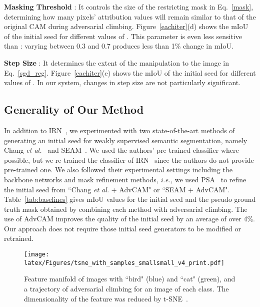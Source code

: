\documentclass[final]{cvpr}
\begin{document}
\textbf{Masking Threshold }: It controls the size of the restricting mask  in Eq.~\ref{mask}, determining how many pixels' attribution values will remain similar to that of the original CAM during adversarial climbing.
Figure~\ref{eachiter}(d) shows the mIoU of the initial seed for different values of . This parameter is even less sensitive than : varying  between 0.3 and 0.7 produces less than 1\% change in mIoU.

\textbf{Step Size }: It determines the extent of the manipulation to the image in Eq.~\ref{sgd_reg}. Figure~\ref{eachiter}(e) shows the mIoU of the initial seed for different values of . In our system, changes in step size  are not particularly significant.



\subsection{Generality of Our Method}\label{generality}
In addition to IRN~\cite{ahn2019weakly}, we experimented with two state-of-the-art methods of generating an initial seed for weakly supervised semantic segmentation, namely Chang \textit{et al.}~\cite{chang2020weakly} and SEAM~\cite{wang2020self}. 
We used the authors' pre-trained classifier where possible, but we re-trained the classifier of IRN~\cite{ahn2019weakly} since the authors do not provide pre-trained one. We also followed their experimental settings including the backbone networks and mask refinement methods, \textit{i.e.,} we used PSA~\cite{ahn2018learning} to refine the initial seed from ``Chang \textit{et al.} + AdvCAM" or ``SEAM + AdvCAM".
Table~\ref{tab:baselines} gives mIoU values for the initial seed and the pseudo ground truth mask obtained by combining each method with adversarial climbing. The use of AdvCAM improves the quality of the initial seed by an average of over 4\%. 
Our approach does not require those initial seed generators to be modified or retrained.


\begin{figure}[t]
\centering
\texttt{[image: latex/Figures/tsne\_with\_samples\_smallsmall\_v4\_print.pdf]}
\caption{\label{fig_tsne} Feature manifold of images with ``bird" (blue) and ``cat" (green), and a trajectory of adversarial climbing for an image of each class. The dimensionality of the feature was reduced by t-SNE~\cite{maaten2008visualizing}.
}
\vspace{-1em}
\end{figure}
 
\end{document}
